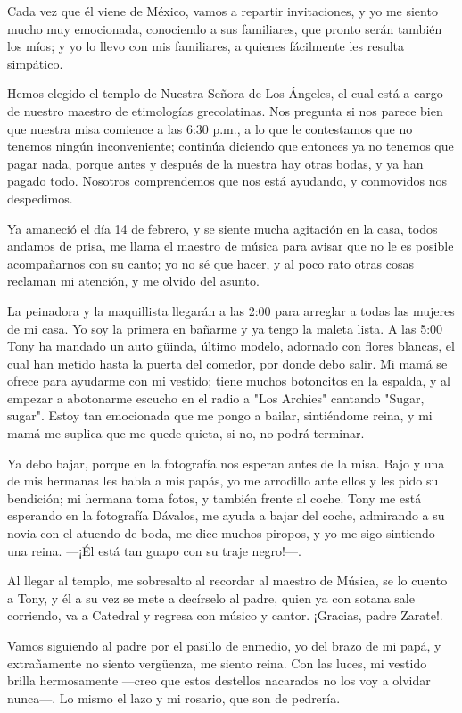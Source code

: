 \documentclass[letterpaper, 12pt]{book}
\begin{document}
Cada vez que él viene de México, vamos a repartir invitaciones, y yo me siento mucho muy emocionada, conociendo a sus familiares, que pronto serán también los míos; y yo lo llevo con mis familiares, a quienes fácilmente les resulta simpático.

Hemos elegido el templo de Nuestra Señora de Los Ángeles, el cual está a cargo de nuestro maestro de etimologías grecolatinas. Nos pregunta si nos parece bien que nuestra misa comience a las 6:30 p.m., a lo que le contestamos que no tenemos ningún inconveniente; continúa diciendo que entonces ya no tenemos que pagar nada, porque antes y después de la nuestra hay otras bodas, y ya han pagado todo. Nosotros comprendemos que nos está ayudando, y conmovidos nos despedimos.

Ya amaneció el día 14 de febrero, y se siente mucha agitación en la casa, todos andamos de prisa, me llama el maestro de música para avisar que no le es posible acompañarnos con su canto; yo no sé que hacer, y al poco rato otras cosas reclaman mi atención, y me olvido del asunto.

La peinadora y la maquillista llegarán a las 2:00 para arreglar a todas las mujeres de mi casa. Yo soy la primera en bañarme y ya tengo la maleta lista.  A las 5:00 Tony ha mandado un auto güinda, último modelo, adornado con flores blancas, el cual han metido hasta la puerta del comedor, por donde debo salir.  Mi mamá se ofrece para ayudarme con mi vestido; tiene muchos botoncitos en la espalda, y al empezar a abotonarme escucho en el radio a "Los Archies" cantando "Sugar, sugar". Estoy tan emocionada que me pongo a bailar, sintiéndome reina, y mi mamá me suplica que me quede quieta, si no, no podrá terminar.

Ya debo bajar, porque en la fotografía nos esperan antes de la misa. Bajo y una de mis hermanas les habla a mis papás, yo me arrodillo ante ellos y les pido su bendición; mi hermana toma fotos, y también frente al coche. Tony me está esperando en la fotografía Dávalos, me ayuda a bajar del coche, admirando a su novia con el atuendo de boda, me dice muchos piropos, y yo me sigo sintiendo una reina. ---¡Él está tan guapo con su traje negro!---.

Al llegar al templo, me sobresalto al recordar al maestro de Música, se lo cuento a Tony, y él a su vez se mete a decírselo al padre, quien ya con sotana sale corriendo, va a Catedral y regresa con músico y cantor. ¡Gracias, padre Zarate!.

Vamos siguiendo al padre por el pasillo de enmedio, yo del brazo de mi papá, y extrañamente no siento vergüenza, me siento reina. Con las luces, mi vestido brilla hermosamente ---creo que estos destellos nacarados no los voy a olvidar nunca---. Lo mismo el lazo y mi rosario, que son de pedrería.
\end{document}
